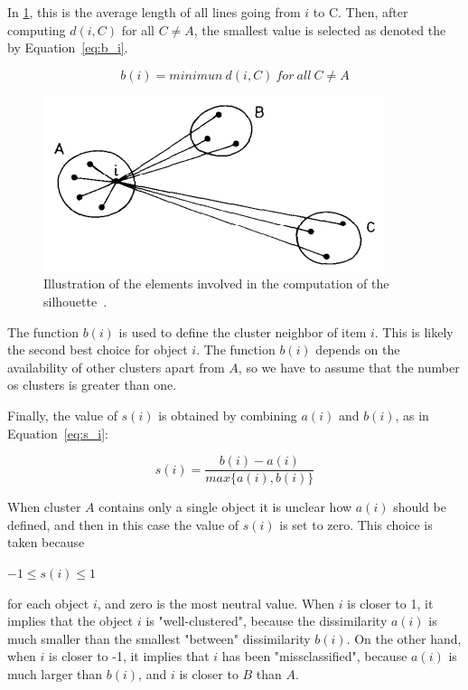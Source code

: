 \documentclass[conference,compsoc]{IEEEtran}
\begin{document}
In \ref{fig:silhouette}, this is the average length of all lines going from $i$ to C. Then, after computing $d(i, C)$ for all $C \neq A$, the smallest value is selected as denoted the by Equation~\ref{eq:b_i}.

\begin{equation} \label{eq:b_i}
b(i) = minimun~d(i, C)~for~all~C \neq A
\end{equation}

\begin{figure}[!htb]
	\centering
	\includegraphics[scale=.6]{figures/silhouette_img.png}
	\caption{Illustration of the elements involved in the computation of the silhouette~\cite{rousseeuw1987silhouettes}.}
	\label{fig:silhouette}
\end{figure}

The function $b(i)$ is used to define the cluster neighbor of item $i$. This is likely the second best choice for object $i$. The function $b(i)$ depends on the availability of other clusters apart from $A$, so we have to assume that the number os clusters is greater than one.

Finally, the value of $s(i)$ is obtained by combining $a(i)$ and $b(i)$, as in  Equation~\ref{eq:s_i}:

\begin{equation} \label{eq:s_i}
s(i) = \frac{b(i) - a(i)}{max\{a(i), b(i)\}}
\end{equation}

When cluster $A$ contains only a single object it is unclear how $a(i)$ should be defined, and then in this case the value of $s(i)$ is set to zero. This choice is taken because
\begin{center}
	$-1 \le s(i) \le 1$
\end{center}

for each object $i$, and zero is the most neutral value. When $i$ is closer to 1, it implies that the object $i$ is "well-clustered", because the dissimilarity $a(i)$ is much smaller than the smallest "between" dissimilarity $b(i)$. On the other hand, when $i$ is closer to -1, it implies that $i$ has been "missclassified", because $a(i)$ is much larger than $b(i)$, and $i$ is closer to $B$ than $A$.
\end{document}
